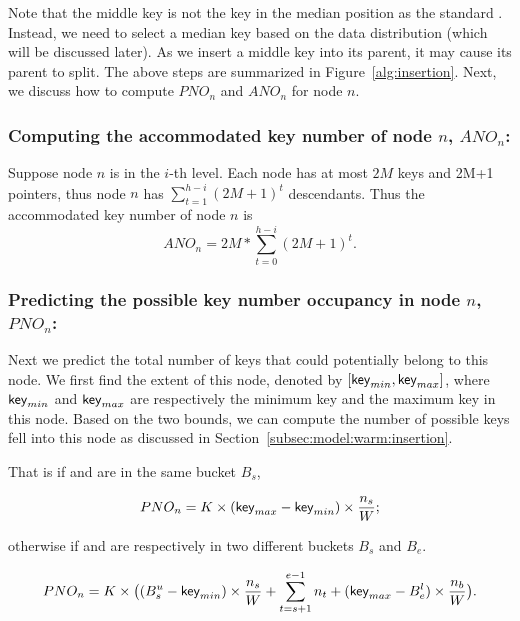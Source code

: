 Note that the middle key is not the key in the median position as the standard \bplustree. Instead, we need to select a median key based on the data distribution (which will be discussed later). As we insert a middle key into its
parent, it may cause its parent to split. The above steps are summarized in Figure~\ref{alg:insertion}.  Next, we discuss how to compute $PNO_n$ and $ANO_n$ for node $n$.

\mbox{}

\subsubsection{Computing the accommodated key number of node $n$, $ANO_n$:} 

Suppose node $n$ is in the $i$-th level. Each node has at most $2M$ keys and 2M+1 pointers, thus node $n$ has $\sum_{t=1}^{h-i} (2M+1)^{t}$ descendants. Thus the accommodated key number of node $n$ is
\begin{equation}ANO_n=2M*\sum_{t=0}^{h-i}(2M+1)^t.\end{equation}



\mbox{}

\subsubsection{Predicting the possible key number occupancy in node $n$, $PNO_n$:} 

Next we predict the total number of keys that could potentially belong to this node. We first find the extent of this node, denoted by $[\textsf{key}_{min},\textsf{key}_{max}]$, where $\textsf{key}_{min}$ and $\textsf{key}_{max}$ are respectively the minimum key and the maximum key in this node. Based on the two bounds, we can compute the number of possible keys fell into this node as discussed in Section~\ref{subsec:model:warm:insertion}.

That is if \eu and \el are in the same bucket $B_s$,

\begin{equation}PNO_n = K \times  (\textsf{key}_{max} - \textsf{key}_{min}) \times \frac{n_s}{W};\end{equation}


\noindent otherwise if \el and \eu are respectively in two different buckets $B_s$ and $B_e$.

\begin{equation}PNO_n = K \times \bigl( (B_s^u-\textsf{key}_{min}) \times \frac{n_s}{W} + \sum_{t=s+1}^{e-1} n_t + (\textsf{key}_{max} - B_e^l) \times \frac{n_b}{W} \bigr).\end{equation}


